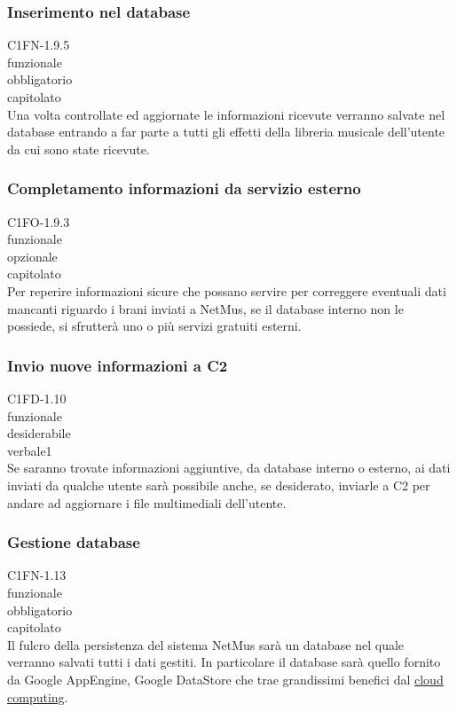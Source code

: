 \subsubsection*{Inserimento nel database}
 C1FN-1.9.5 \\
 funzionale \\
 obbligatorio \\
 capitolato \\
Una volta controllate ed aggiornate le informazioni ricevute verranno salvate
nel database entrando a far parte a tutti gli effetti della libreria musicale
dell'utente da cui sono state ricevute.

\subsubsection*{Completamento informazioni da servizio esterno}
 C1FO-1.9.3 \\
 funzionale \\
 opzionale \\
 capitolato \\
Per reperire informazioni sicure che possano servire per correggere eventuali
dati mancanti riguardo i brani inviati a NetMus, se il database interno non le
possiede, si sfrutter\`a uno o pi\`u servizi gratuiti esterni.

\subsubsection*{Invio nuove informazioni a C2}
 C1FD-1.10 \\
 funzionale \\
 desiderabile \\
 verbale1 \\
Se saranno trovate informazioni aggiuntive, da database interno o esterno, ai
dati inviati da qualche utente sar\`a possibile anche, se desiderato, inviarle
a C2 per andare ad aggiornare i file multimediali dell'utente.

\subsubsection*{Gestione database}
 C1FN-1.13 \\
 funzionale \\
 obbligatorio \\
 capitolato \\
Il fulcro della persistenza del sistema NetMus sar\`a un database nel quale
verranno salvati tutti i dati gestiti. In particolare il database sar\`a quello
fornito da Google AppEngine, Google DataStore che trae grandissimi benefici dal
\underline{cloud computing}.

